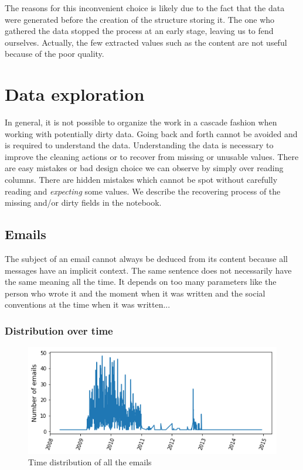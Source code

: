 \documentclass[11pt]{article}
\begin{document}
The reasons for this inconvenient choice is likely due to the fact that the data were generated before the creation of the structure storing it. The one who gathered the data stopped the process at an early stage, leaving us to fend ourselves. Actually, the few extracted values such as the content are not useful because of the poor quality.

\section{Data exploration}

In general, it is not possible to organize the work in a cascade fashion when working with potentially dirty data. Going back and forth cannot be avoided and is required to understand the data. Understanding the data is necessary to improve the cleaning actions or to recover from missing or unusable values. There are easy mistakes or bad design choice we can observe by simply over reading columns. There are hidden mistakes which cannot be spot without carefully reading and \emph{expecting} some values. We describe the recovering process of the missing and/or dirty fields in the notebook.

\subsection{Emails}

The subject of an email cannot always be deduced from its content because all messages have an implicit context. The same sentence does not necessarily have the same meaning all the time. It depends on too many parameters like the person who wrote it and the moment when it was written and the social conventions at the time when it was written...

\subsubsection{Distribution over time}

\begin{figure}[h]
	\centering
	\includegraphics[width=\linewidth]{images/emails_distribution.png}
	\caption{Time distribution of all the emails}
	\label{fig:emails_time_distribution}
\end{figure}
\end{document}
